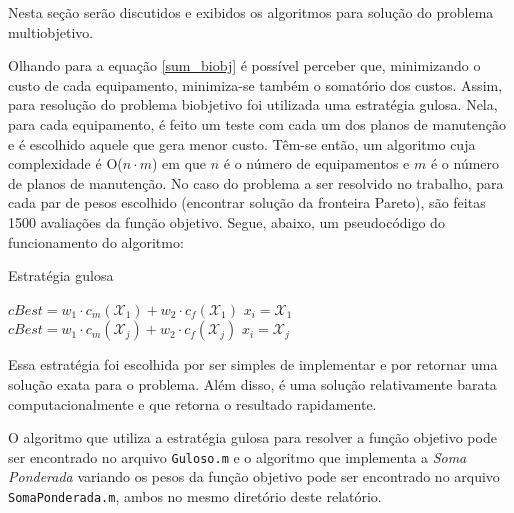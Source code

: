 Nesta seção serão discutidos e exibidos os algoritmos para solução do problema multiobjetivo.

Olhando para a equação \ref{sum_biobj} é possível perceber que, minimizando o custo de cada equipamento, minimiza-se também o somatório dos custos. Assim, para resolução do problema biobjetivo foi utilizada uma estratégia gulosa. Nela, para cada equipamento, é feito um teste com cada um dos planos de manutenção e é escolhido aquele que gera menor custo. Têm-se então, um algoritmo cuja complexidade é O($n\cdot m$) em que $n$ é o número de equipamentos e $m$ é o número de planos de manutenção. No caso do problema a ser resolvido no trabalho, para cada par de pesos escolhido (encontrar solução da fronteira Pareto), são feitas 1500 avaliações da função objetivo. Segue, abaixo, um pseudocódigo do funcionamento do algoritmo:

\begin{algorithm}
	\caption{Estratégia gulosa}
	\begin{algorithmic}[1]
			\State $cBest = w_1 \cdot c_m(\mathcal{X}_1) + w_2 \cdot c_f(\mathcal{X}_1)$
			\State $x_i = \mathcal{X}_1$
					\State $cBest = w_1 \cdot c_m(\mathcal{X}_j) + w_2 \cdot c_f(\mathcal{X}_j)$
					\State $x_i = \mathcal{X}_j$
					\EndIf
			\EndFor
		\EndFor
		
	\end{algorithmic}
\end{algorithm}

Essa estratégia foi escolhida por ser simples de implementar e por retornar uma solução exata para o problema. Além disso, é uma solução relativamente barata computacionalmente e que retorna o resultado rapidamente.

O algoritmo que utiliza a estratégia gulosa para resolver a função objetivo pode ser encontrado no arquivo \texttt{Guloso.m} e o algoritmo que implementa a \emph{Soma Ponderada} variando os pesos da função objetivo pode ser encontrado no arquivo \texttt{SomaPonderada.m}, ambos no mesmo diretório deste relatório.